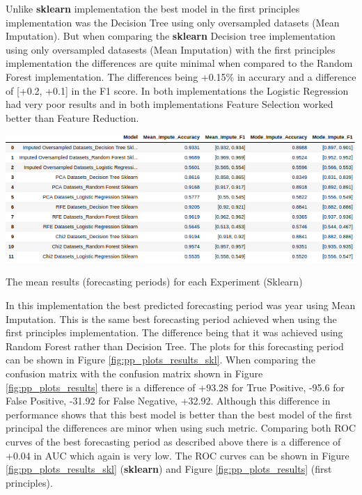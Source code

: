 \noindent Unlike \textbf{sklearn} implementation the best model in the first principles implementation was the Decision Tree using only oversampled datasets (Mean Imputation). But when comparing the \textbf{sklearn} Decision tree implementation using only oversampled datasests (Mean Imputation) with the first principles implementation the differences are quite minimal when compared to the Random Forest implementation. The differences being +0.15\% in accurary and a difference of [+0.2, +0.1] in the F1 score. In both implementations the Logistic Regression had very poor results and in both implementations Feature Selection worked better than Feature Reduction.
\begin{table}[H]
\centering
  \includegraphics[scale = .7]{imgs/mean_metrics_skl.png}
  \caption{The mean results (forecasting periods) for each Experiment (Sklearn)}
  \label{table:mean_metrics_skl}
\end{table}
\noindent In this implementation the best predicted forecasting period was  year using Mean Imputation. This is the same best forecasting period achieved when using the first principles implementation. The difference being that it was achieved using Random Forest rather than Decision Tree. The plots for this forecasting period can be shown in Figure \ref{fig:pp_plots_results_skl}. When comparing the confusion matrix with the confusion matrix shown in Figure \ref{fig:pp_plots_results} there is a difference of +93.28 for True Positive, -95.6 for False Positive, -31.92 for False Negative, +32.92. Although this difference in performance shows that this best model is better than the best model of the first principal the differences are minor when using such metric. 
\noindent Comparing both ROC curves of the best forecasting period as described above there is a difference of +0.04 in AUC which again is very low. The ROC curves can be shown in Figure \ref{fig:pp_plots_results_skl} (\textbf{sklearn}) and Figure \ref{fig:pp_plots_results} (first principles).

